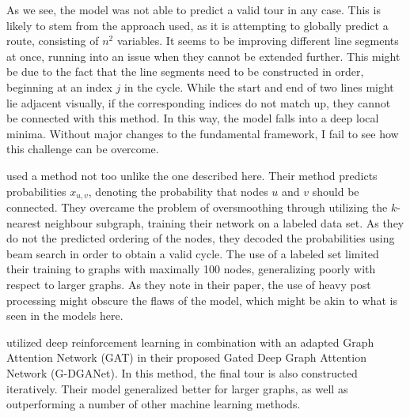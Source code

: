 As we see, the model was not able to predict a valid tour in any case.
This is likely to stem from the approach used, as it is attempting to globally predict a route, consisting of $n^2$ variables.
It seems to be improving different line segments at once, running into an issue when they cannot be extended further.
This might be due to the fact that the line segments need to be constructed in order, beginning at an index $j$ in the cycle.
While the start and end of two lines might lie adjacent visually, if the corresponding indices do not match up, they cannot be connected with this method.
In this way, the model falls into a deep local minima.
Without major changes to the fundamental framework, I fail to see how this challenge can be overcome.

\textcite{joshi2019efficient} used a method not too unlike the one described here.
Their method predicts probabilities $x_{u,v}$, denoting the probability that nodes $u$ and $v$ should be connected.
They overcame the problem of oversmoothing through utilizing the $k$-nearest neighbour subgraph, training their network on a labeled data set.
As they do not the predicted ordering of the nodes, they decoded the probabilities using beam search in order to obtain a valid cycle.
The use of a labeled set limited their training to graphs with maximally 100 nodes, generalizing poorly with respect to larger graphs.
As they note in their paper, the use of heavy post processing might obscure the flaws of the model, which might be akin to what is seen in the models here.

\textcite{FELLEK2024127392} utilized deep reinforcement learning in combination with an adapted Graph Attention Network (GAT) in their proposed Gated Deep Graph Attention Network (G-DGANet).
In this method, the final tour is also constructed iteratively.
Their model generalized better for larger graphs, as well as outperforming a number of other machine learning methods.

